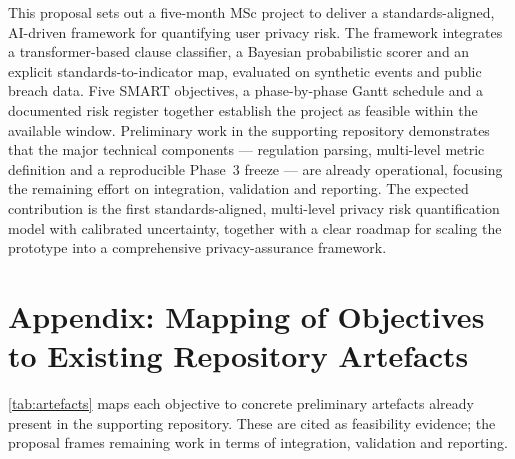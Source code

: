 \documentclass[12pt,a4paper,titlepage]{article}
\let\orgautoref\autoref
\renewcommand{\autoref}[1]{\def\equationautorefname{Eq.}\orgautoref{#1}}
\begin{document}
This proposal sets out a five-month MSc project to deliver a standards-aligned, AI-driven framework for quantifying user privacy risk. The framework integrates a transformer-based clause classifier, a Bayesian probabilistic scorer and an explicit standards-to-indicator map, evaluated on synthetic events and public breach data. Five SMART objectives, a phase-by-phase Gantt schedule and a documented risk register together establish the project as feasible within the available window. Preliminary work in the supporting repository demonstrates that the major technical components --- regulation parsing, multi-level metric definition and a reproducible Phase~3 freeze --- are already operational, focusing the remaining effort on integration, validation and reporting. The expected contribution is the first standards-aligned, multi-level privacy risk quantification model with calibrated uncertainty, together with a clear roadmap for scaling the prototype into a comprehensive privacy-assurance framework.

\newpage
\printbibliography[heading=bibintoc]

\newpage
{}
\appendix

\section{Appendix: Mapping of Objectives to Existing Repository Artefacts}\label{app:artefacts}

\autoref{tab:artefacts} maps each objective to concrete preliminary artefacts already present in the supporting repository. These are cited as feasibility evidence; the proposal frames remaining work in terms of integration, validation and reporting.
\end{document}
